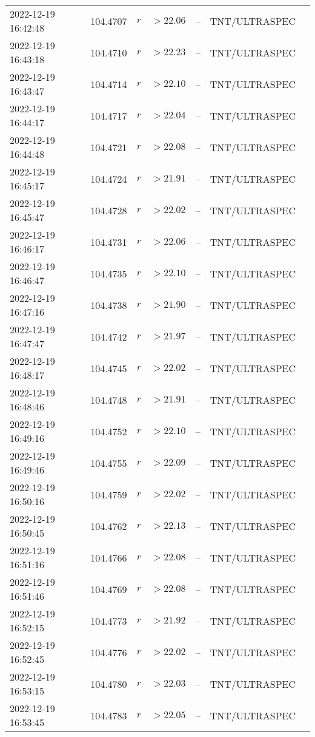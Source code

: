\documentclass{nature_plusfigure}
\begin{document}
\begin{supplement}
\begin{center}
\begin{longtable}{lllllll}
2022-12-19 16:42:48 & 104.4707 & $r$ & $>22.06$ & -- & TNT/ULTRASPEC &  \\ 
2022-12-19 16:43:18 & 104.4710 & $r$ & $>22.23$ & -- & TNT/ULTRASPEC &  \\ 
2022-12-19 16:43:47 & 104.4714 & $r$ & $>22.10$ & -- & TNT/ULTRASPEC &  \\ 
2022-12-19 16:44:17 & 104.4717 & $r$ & $>22.04$ & -- & TNT/ULTRASPEC &  \\ 
2022-12-19 16:44:48 & 104.4721 & $r$ & $>22.08$ & -- & TNT/ULTRASPEC &  \\ 
2022-12-19 16:45:17 & 104.4724 & $r$ & $>21.91$ & -- & TNT/ULTRASPEC &  \\ 
2022-12-19 16:45:47 & 104.4728 & $r$ & $>22.02$ & -- & TNT/ULTRASPEC &  \\ 
2022-12-19 16:46:17 & 104.4731 & $r$ & $>22.06$ & -- & TNT/ULTRASPEC &  \\ 
2022-12-19 16:46:47 & 104.4735 & $r$ & $>22.10$ & -- & TNT/ULTRASPEC &  \\ 
2022-12-19 16:47:16 & 104.4738 & $r$ & $>21.90$ & -- & TNT/ULTRASPEC &  \\ 
2022-12-19 16:47:47 & 104.4742 & $r$ & $>21.97$ & -- & TNT/ULTRASPEC &  \\ 
2022-12-19 16:48:17 & 104.4745 & $r$ & $>22.02$ & -- & TNT/ULTRASPEC &  \\ 
2022-12-19 16:48:46 & 104.4748 & $r$ & $>21.91$ & -- & TNT/ULTRASPEC &  \\ 
2022-12-19 16:49:16 & 104.4752 & $r$ & $>22.10$ & -- & TNT/ULTRASPEC &  \\ 
2022-12-19 16:49:46 & 104.4755 & $r$ & $>22.09$ & -- & TNT/ULTRASPEC &  \\ 
2022-12-19 16:50:16 & 104.4759 & $r$ & $>22.02$ & -- & TNT/ULTRASPEC &  \\ 
2022-12-19 16:50:45 & 104.4762 & $r$ & $>22.13$ & -- & TNT/ULTRASPEC &  \\ 
2022-12-19 16:51:16 & 104.4766 & $r$ & $>22.08$ & -- & TNT/ULTRASPEC &  \\ 
2022-12-19 16:51:46 & 104.4769 & $r$ & $>22.08$ & -- & TNT/ULTRASPEC &  \\ 
2022-12-19 16:52:15 & 104.4773 & $r$ & $>21.92$ & -- & TNT/ULTRASPEC &  \\ 
2022-12-19 16:52:45 & 104.4776 & $r$ & $>22.02$ & -- & TNT/ULTRASPEC &  \\ 
2022-12-19 16:53:15 & 104.4780 & $r$ & $>22.03$ & -- & TNT/ULTRASPEC &  \\ 
2022-12-19 16:53:45 & 104.4783 & $r$ & $>22.05$ & -- & TNT/ULTRASPEC &  \\ 

\end{longtable}
\end{center}
\end{supplement}
\end{document}
